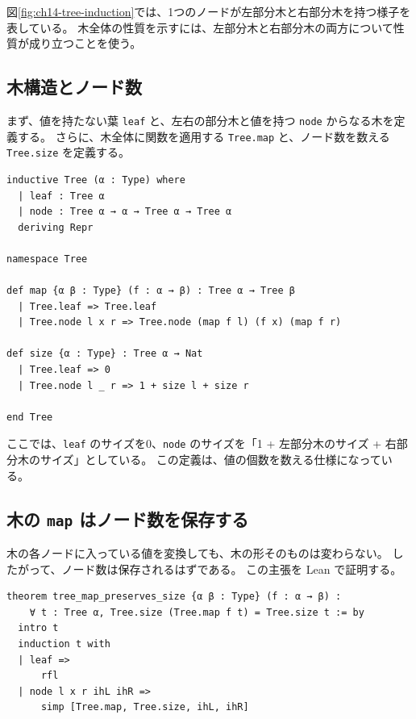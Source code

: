 
図\ref{fig:ch14-tree-induction}では、1つのノードが左部分木と右部分木を持つ様子を表している。
木全体の性質を示すには、左部分木と右部分木の両方について性質が成り立つことを使う。

\subsection{木構造とノード数}

まず、値を持たない葉 \texttt{leaf} と、左右の部分木と値を持つ \texttt{node} からなる木を定義する。
さらに、木全体に関数を適用する \texttt{Tree.map} と、ノード数を数える \texttt{Tree.size} を定義する。

\begin{listing}[htbp]
\begin{verbatim}
inductive Tree (α : Type) where
  | leaf : Tree α
  | node : Tree α → α → Tree α → Tree α
  deriving Repr

namespace Tree

def map {α β : Type} (f : α → β) : Tree α → Tree β
  | Tree.leaf => Tree.leaf
  | Tree.node l x r => Tree.node (map f l) (f x) (map f r)

def size {α : Type} : Tree α → Nat
  | Tree.leaf => 0
  | Tree.node l _ r => 1 + size l + size r

end Tree
\end{verbatim}
\caption{単純な二分木とノード数}
\label{lst:induction-tree-def}
\end{listing}

ここでは、\texttt{leaf} のサイズを0、\texttt{node} のサイズを「1 + 左部分木のサイズ + 右部分木のサイズ」としている。
この定義は、値の個数を数える仕様になっている。

\subsection{木の \texttt{map} はノード数を保存する}

木の各ノードに入っている値を変換しても、木の形そのものは変わらない。
したがって、ノード数は保存されるはずである。
この主張を Lean で証明する。

\begin{listing}[htbp]
\begin{verbatim}
theorem tree_map_preserves_size {α β : Type} (f : α → β) :
    ∀ t : Tree α, Tree.size (Tree.map f t) = Tree.size t := by
  intro t
  induction t with
  | leaf =>
      rfl
  | node l x r ihL ihR =>
      simp [Tree.map, Tree.size, ihL, ihR]
\end{verbatim}
\caption{Tree.map はノード数を保存する}
\label{lst:induction-tree-size}
\end{listing}

